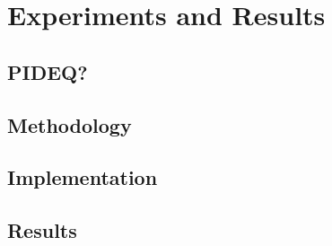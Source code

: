 \chapter{Experiments and Results}

\section{PIDEQ?}

\section{Methodology}

\section{Implementation}

\section{Results}
